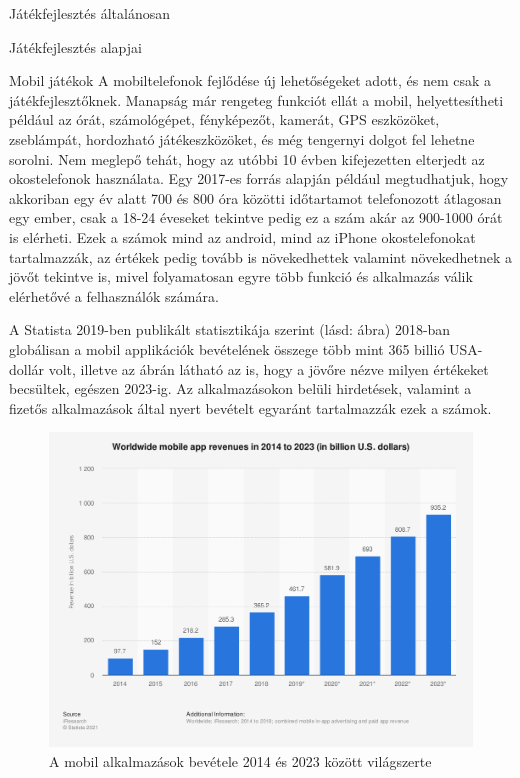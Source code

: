 \begin{MyChapter}{Játékfejlesztés általánosan}
\begin{MySection}{Játékfejlesztés alapjai}
\begin{MySubSection}{Mobil játékok}
		A mobiltelefonok fejlődése új lehetőségeket adott, és nem csak a játékfejlesztőknek. Manapság már rengeteg funkciót ellát a mobil, helyettesítheti például az órát, számológépet, fényképezőt, kamerát, GPS eszközöket, zseblámpát, hordozható játékeszközöket, és még tengernyi dolgot fel lehetne sorolni. Nem meglepő tehát, hogy az utóbbi 10 évben kifejezetten elterjedt az okostelefonok használata. 
		Egy 2017-es forrás alapján például megtudhatjuk, hogy akkoriban egy év alatt 700 és 800 óra közötti időtartamot telefonozott átlagosan egy ember, csak a 18-24 éveseket tekintve pedig ez a szám akár az 900-1000 órát is elérheti. Ezek a számok mind az android, mind az iPhone okostelefonokat tartalmazzák, az értékek pedig tovább is növekedhettek valamint növekedhetnek a jövőt tekintve is, mivel folyamatosan egyre több funkció és alkalmazás válik elérhetővé a felhasználók számára.
		
		A Statista 2019-ben publikált statisztikája szerint (lásd:  ábra) 2018-ban globálisan a mobil applikációk bevételének összege több mint 365 billió USA-dollár volt, illetve az ábrán látható az is, hogy a jövőre nézve milyen értékeket becsültek, egészen 2023-ig. Az alkalmazásokon belüli hirdetések, valamint a fizetős alkalmazások által nyert bevételt egyaránt tartalmazzák ezek a számok.
		\begin{figure}[h!]
			\centering
			\includegraphics[scale=0.38]{kepek/mobil/total_global_mobile_app_revenues_2014-2023.png}
			\caption{A mobil alkalmazások bevétele 2014 és 2023 között világszerte}
			\label{fig:mobil:total_global_mobile_app_revenues_2014-2023}
		\end{figure}
		

\end{MySubSection}
\end{MySection}
\end{MyChapter}

